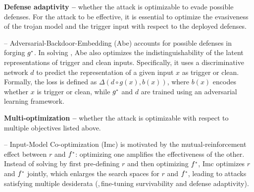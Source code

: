 \documentclass[compsoc,conference,a4paper,10pt,times]{IEEEtran}
\newcommand{\abe}{{\sc Abe}\xspace}
\newcommand{\imc}{{\sc Imc}\xspace}
\begin{document}
\vspace{2pt}
{\bf Defense adaptivity --}  whether the attack is optimizable to evade possible defenses. For the attack to be effective, it is essential to optimize the evasiveness of the trojan model and the trigger input with respect to the deployed defenses.

-- Adversarial-Backdoor-Embedding (\abe) accounts for possible defenses in forging $\sg$. In solving , \abe also optimizes the indistinguishability of the latent representations of trigger and clean inputs. Specifically, it uses a discriminative network $d$ to predict the representation of a given input $x$ as trigger or clean. Formally, the loss is defined as $\Delta(d\circ g(x), b(x))$, where $b(x)$ encodes whether $x$ is trigger or clean, while $\sg$ and $d$ are trained using an adversarial learning framework.


\vspace{2pt}
{\bf Multi-optimization --} whether the attack is optimizable with respect to multiple objectives listed above. 

-- Input-Model Co-optimization (\imc) is motivated by the mutual-reinforcement effect between $r$ and $\uf$: optimizing one amplifies the effectiveness of the other. Instead of solving  by first pre-defining $r$ and then optimizing $\uf$, \imc optimizes $r$ and $\uf$ jointly, which enlarges the search spaces for $r$ and $\uf$, leading to attacks satisfying multiple desiderata (\meg,\,fine-tuning survivability and defense adaptivity).
\end{document}
